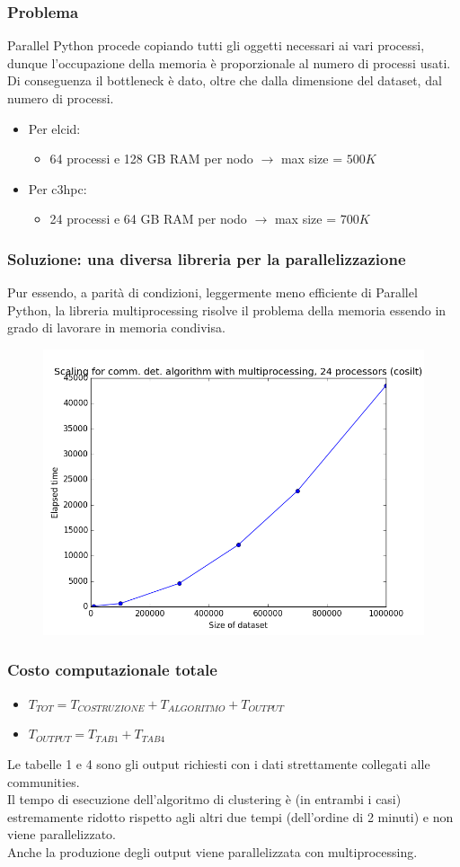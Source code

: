 \documentclass{beamer}
\begin{document}
\begin{frame}
\frametitle{Problema}
Parallel Python procede copiando tutti gli oggetti necessari ai vari processi, dunque l'occupazione della memoria è proporzionale al numero di processi usati.\\
Di conseguenza il bottleneck è dato, oltre che dalla dimensione del dataset, dal numero di processi.
\begin{itemize}
\item Per elcid:
\begin{itemize}
\item 64 processi e 128 GB RAM per nodo $\rightarrow$ max size = $500K$
\end{itemize}
\item Per c3hpc:
\begin{itemize}
\item 24 processi e 64 GB RAM per nodo $\rightarrow$ max size = $700K$
\end{itemize}
\end{itemize}
\end{frame}
\begin{frame}
\frametitle{Soluzione: una diversa libreria per la parallelizzazione}
Pur essendo, a parità di condizioni, leggermente meno efficiente di Parallel Python, la libreria multiprocessing risolve il problema della memoria essendo in grado di lavorare in memoria condivisa.
\begin{figure}[htbp]
\centering
\includegraphics[height=6.0 cm,width=10 cm]{24cores_shared.png}

\end{figure}
\end{frame}
\begin{frame}
 \frametitle{Costo computazionale totale}
 \begin{itemize}
 \item $T_{TOT} = T_{COSTRUZIONE}+T_{ALGORITMO}+T_{OUTPUT}$
 \item $T_{OUTPUT} = T_{TAB1}+T_{TAB4}$
 \end{itemize}
 Le tabelle 1 e 4 sono gli output richiesti con i dati strettamente collegati alle communities.\\
 Il tempo di esecuzione dell'algoritmo di clustering è (in entrambi i casi) estremamente ridotto rispetto agli altri due tempi (dell'ordine di 2 minuti) e non viene parallelizzato.\\
 Anche la produzione degli output viene parallelizzata con multiprocessing.

\end{frame}
\end{document}
